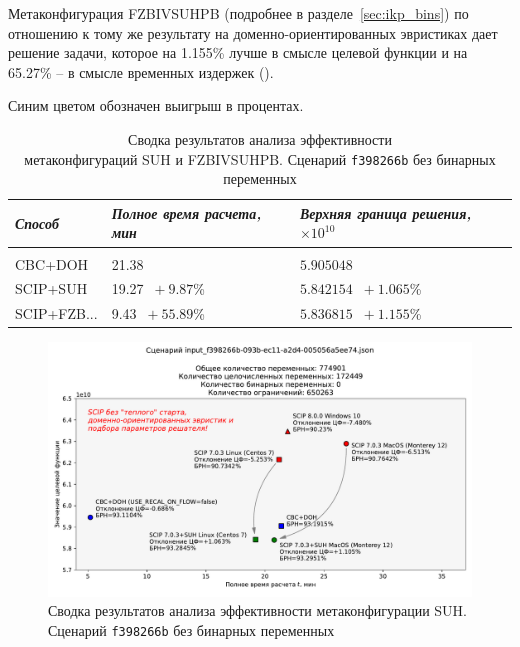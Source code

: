 \documentclass[%
	11pt,
	a4paper,
	utf8,
		]{article}
\begin{document}
Метаконфигурация FZBIVSUHPB (подробнее в разделе~\ref{sec:ikp_bins}) по отношению к тому же результату на доменно-ориентированных эвристиках дает решение задачи, которое на 1.155\% лучше в смысле целевой функции и на 65.27\% -- в смысле временных издержек ().

Синим цветом обозначен выигрыш в процентах.

{
	\begin{table}[!h]
		\centering
		\caption{Сводка результатов анализа эффективности \\метаконфигураций SUH и FZBIVSUHPB. Сценарий \texttt{f398266b} без бинарных переменных}
		\begin{tabular}{ p{2.5cm} p{3.3cm} p{3.4cm} }
			\emph{Способ} & \emph{Полное время расчета, мин} & \emph{Верхняя граница решения, $ \times 10^{10} $} \\
			\hline\hline\\[-3.5mm]
			{CBC+DOH} & 21.38 & $ 5.905048 $ \\
			\hline
			SCIP+SUH & 19.27 {\color{blue} $\ +9.87 $\%} & $ 5.842154 $ {\color{blue} $\ +1.065 $\%} \\
			\hline
			SCIP+FZB... & 9.43 {\color{blue} $\ +55.89 $\%} & $ 5.836815 $ {\color{blue} $\ +1.155 $\%} \\
		\end{tabular}\label{tab:f398266b_wo_bins}
	\end{table}
}

\begin{figure}[!h]
	\centering
	\includegraphics[scale=0.6]{figures/summary_f398266b.pdf}
	\caption{Сводка результатов анализа эффективности метаконфигурации SUH. \\Сценарий \texttt{f398266b} без бинарных переменных}\label{fig:summary_f398266b}
\end{figure}
\end{document}
